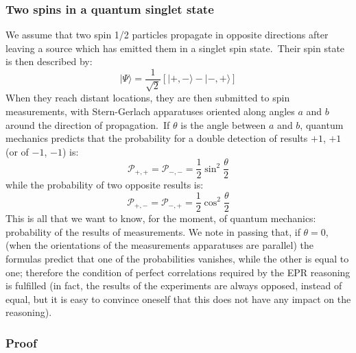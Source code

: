 \documentclass[12pt,onecolumn]{article}%
\begin{document}
\subsubsection{Two spins in a quantum singlet state}

We assume that two spin 1/2 particles propagate in opposite directions after
leaving a source which has emitted them in a singlet spin state.\ Their spin
state is then described by:%
\begin{equation}
|\Psi\rangle =\frac{1}{\sqrt{2}}\left[  |+,-\rangle -|-,+\rangle \right]  \label{0}%
\end{equation}
When they reach distant locations, they are then submitted to spin
measurements, with Stern-Gerlach apparatuses oriented along angles $a$ and $b$
around the direction of propagation.\ If $\theta$ is the angle between $a$ and
$b$, quantum mechanics predicts that the probability for a double detection of
results $+1$, $+1$ (or of $-1$, $-1$) is:
\begin{equation}
\mathcal{P}_{+,+}=\mathcal{P}_{-,-}=\frac{1}{2}\sin^{2}\frac{\theta}{2}
\label{1}%
\end{equation}
while the probability of two opposite results is:
\begin{equation}
\mathcal{P}_{+,-}=\mathcal{P}_{-,+}=\frac{1}{2}\cos^{2}\frac{\theta}{2}
\label{2}%
\end{equation}
This is all that we want to know, for the moment, of quantum mechanics:
probability of the results of measurements. We note in passing that, if
$\theta=0$, (when the orientations of the measurements apparatuses are
parallel) the formulas predict that one of the probabilities vanishes, while
the other is equal to one; therefore the condition of perfect correlations
required by the EPR reasoning is fulfilled (in fact, the results of the
experiments are always opposed, instead of equal, but it is easy to convince
oneself that this does not have any impact on the reasoning).

\subsubsection{Proof}

\label{proof}
\end{document}
